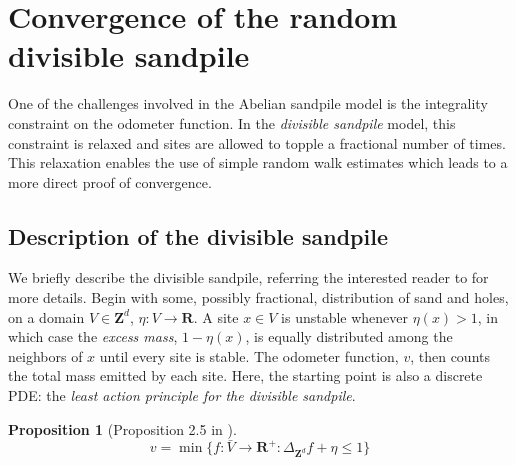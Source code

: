 \documentclass[12pt]{amsart}
\newcommand{\R}{\mathbf{R}}
\newcommand{\Z}{\mathbf{Z}}
\newtheorem{prop}{Proposition}[section]
\begin{document}









\section{Convergence of the random divisible sandpile} \label{sec:divisible_sandpile}
One of the challenges involved in the Abelian sandpile model is the integrality constraint on the odometer function. 
In the {\it divisible sandpile} model, this constraint is relaxed and sites are allowed to topple a fractional number of times. 
This relaxation enables the use of simple random walk estimates which leads to a more direct proof of convergence. 

\subsection{Description of the divisible sandpile}
We briefly describe the divisible sandpile, referring the interested reader to \cite{levine2010scaling,levine2016divisible} for more details. 
Begin with some, possibly fractional, distribution of sand and holes, on a domain $V \in \Z^d$,  $\eta : V \to \R$.  A site $x \in V$ is unstable whenever $\eta(x) > 1$, 
in which case the {\it excess mass}, $1 - \eta(x)$, is equally distributed among the neighbors of $x$ until every site is stable. The odometer function, 
$v$, then counts the total mass emitted by each site. Here, the starting point is also a discrete PDE: the 
{\it least action principle for the divisible sandpile}. 
\begin{prop}[Proposition 2.5 in \cite{levine2016divisible}] \label{prop:div_lap}
\[
v = \min\{ f: \bar{V} \to \R^+: \Delta_{\Z^d} f + \eta \leq 1 \}
\]
\end{prop}
\end{document}
